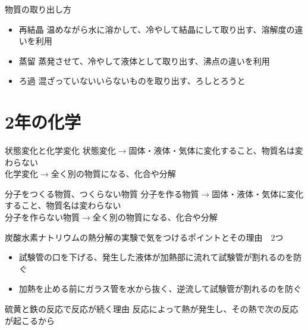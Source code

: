 \documentclass[10pt,dvipdfmx]{jsarticle}
\newcommand{\answer}[2]{{\color{orange}#2}}
\newcommand{\answer}[2]{\vspace{#1mm}}
\begin{document}
\begin{itembox}[l]{物質の取り出し方}
	\begin{Large}
		\begin{itemize}
			\item 再結晶 \answer{0}{
				      \normalsize 温めながら水に溶かして、冷やして結晶にして取り出す、溶解度の違いを利用}
			\item 蒸留 \answer{0}{\normalsize 蒸発させて、冷やして液体として取り出す、沸点の違いを利用}
			\item ろ過 \answer{0}{\normalsize 混ざっていないいらないものを取り出す、ろしとろうと}
		\end{itemize}
	\end{Large}
\end{itembox}

\newpage

\section{2年の化学}
\begin{itembox}[l]{状態変化と化学変化}
	\answer{10}{
		状態変化$\rightarrow$固体・液体・気体に変化すること、物質名は変わらない\\
		化学変化$\rightarrow$全く別の物質になる、化合や分解
	}
\end{itembox}



\begin{itembox}[l]{分子をつくる物質、つくらない物質}
	\answer{10}{
		分子を作る物質$\rightarrow$固体・液体・気体に変化すること、物質名は変わらない\\
		分子を作らない物質$\rightarrow$全く別の物質になる、化合や分解
	}
\end{itembox}

\begin{itembox}[l]{炭酸水素ナトリウムの熱分解の実験で気をつけるポイントとその理由　2つ}
	\begin{Large}
		\begin{itemize}
			\item \answer{0}{\normalsize 試験管の口を下げる、発生した液体が加熱部に流れて試験管が割れるのを防ぐ}
			\item \answer{0}{\normalsize 加熱を止める前にガラス管を水から抜く、逆流して試験管が割れるのを防ぐ}
		\end{itemize}
	\end{Large}
\end{itembox}

\begin{itembox}[l]{硫黄と鉄の反応で反応が続く理由}
	\answer{10}{反応によって熱が発生し、その熱で次の反応が起こるから}
\end{itembox}
\end{document}
